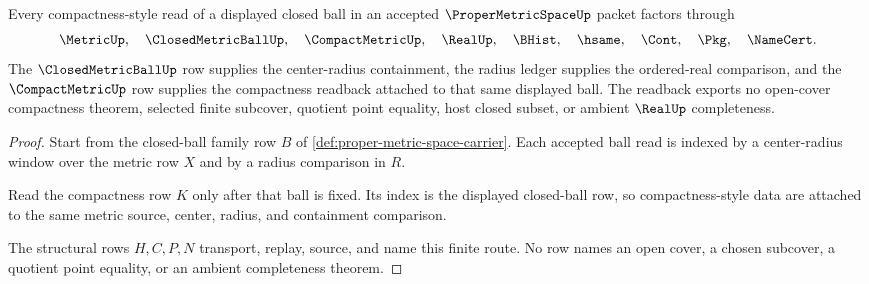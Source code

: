 \begin{theorem}
\label{thm:proper-metric-space-closed-ball-compactness-readback}
Every compactness-style read of a displayed closed ball in an accepted $\ProperMetricSpaceUp$ packet factors through
$$
\MetricUp,\quad \ClosedMetricBallUp,\quad \CompactMetricUp,\quad \RealUp,\quad \BHist,\quad \hsame,\quad \Cont,\quad \Pkg,\quad \NameCert .
$$
The $\ClosedMetricBallUp$ row supplies the center-radius containment, the radius ledger supplies the ordered-real comparison, and the $\CompactMetricUp$ row supplies the compactness readback attached to that same displayed ball. The readback exports no open-cover compactness theorem, selected finite subcover, quotient point equality, host closed subset, or ambient $\RealUp$ completeness.
\end{theorem}
\begin{proof}
Start from the closed-ball family row $B$ of \autoref{def:proper-metric-space-carrier}. Each accepted ball read is indexed by a center-radius window over the metric row $X$ and by a radius comparison in $R$.

Read the compactness row $K$ only after that ball is fixed. Its index is the displayed closed-ball row, so compactness-style data are attached to the same metric source, center, radius, and containment comparison.

The structural rows $H,C,P,N$ transport, replay, source, and name this finite route. No row names an open cover, a chosen subcover, a quotient point equality, or an ambient completeness theorem.
\end{proof}

